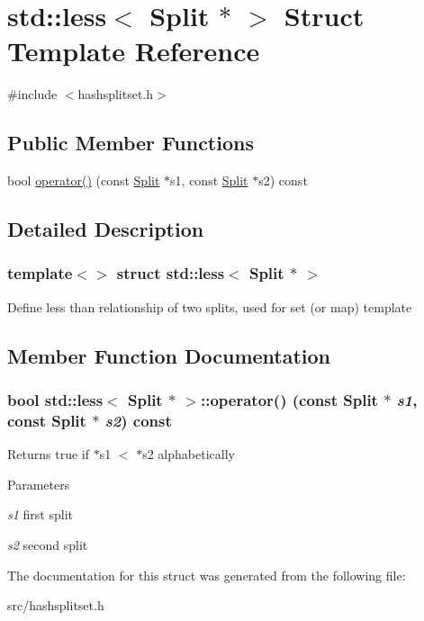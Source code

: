 \hypertarget{structstd_1_1less_3_01Split_01_5_01_4}{
\section{std::less$<$ Split $\ast$ $>$ Struct Template Reference}
\label{structstd_1_1less_3_01Split_01_5_01_4}
}


{\ttfamily \#include $<$hashsplitset.h$>$}\subsection*{Public Member Functions}
\begin{DoxyCompactItemize}
\item 
bool \hyperlink{structstd_1_1less_3_01Split_01_5_01_4_ac0a084b10fedf41d9459766b5c3a0033}{operator()} (const \hyperlink{classSplit}{Split} $\ast$s1, const \hyperlink{classSplit}{Split} $\ast$s2) const 
\end{DoxyCompactItemize}


\subsection{Detailed Description}
\subsubsection*{template$<$$>$ struct std::less$<$ Split $\ast$ $>$}

Define less than relationship of two splits, used for set (or map) template 

\subsection{Member Function Documentation}
\hypertarget{structstd_1_1less_3_01Split_01_5_01_4_ac0a084b10fedf41d9459766b5c3a0033}{
\subsubsection[{operator()}]{\setlength{\rightskip}{0pt plus 5cm}bool std::less$<$ {\bf Split} $\ast$ $>$::operator() (const {\bf Split} $\ast$ {\em s1}, \/  const {\bf Split} $\ast$ {\em s2}) const}}
\label{structstd_1_1less_3_01Split_01_5_01_4_ac0a084b10fedf41d9459766b5c3a0033}
\begin{DoxyReturn}{Returns}
true if $\ast$s1 $<$ $\ast$s2 alphabetically 
\end{DoxyReturn}

\begin{DoxyParams}{Parameters}
\item[{\em s1}]first split \item[{\em s2}]second split \end{DoxyParams}


The documentation for this struct was generated from the following file:\begin{DoxyCompactItemize}
\item 
src/hashsplitset.h\end{DoxyCompactItemize}
